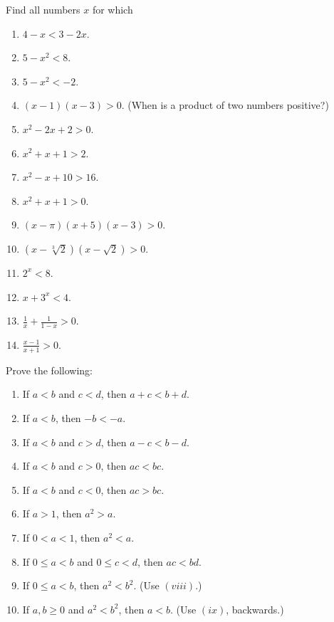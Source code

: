 \documentclass[12pt]{article}
\newenvironment{problem}[2][Problem]{\begin{trivlist}
\item[\hskip \labelsep {\bfseries #1}\hskip \labelsep {\bfseries #2.}]}{\end{trivlist}}
\begin{document}
\begin{problem}{1.4}
Find all numbers $x$ for which
\begin{enumerate}[label=(\roman*)]
	\item $4-x < 3-2x$.
	\item $5-x^2 < 8$.
	\item $5-x^2 < -2$.
	\item $\left(x-1\right)\left(x-3\right) > 0$. (When is a product of two numbers positive?)
	\item $x^2 - 2x+2 > 0$.
	\item $x^2+x+1>2$.
	\item $x^2 -x+10 > 16$.
	\item $x^2+x+1>0$.
	\item $\left(x-\pi\right)\left(x+5\right)\left(x-3\right) > 0$.
	\item $\left(x-\sqrt[3]{2}\right)\left(x-\sqrt{2}\right) > 0$.
	\item $2^x < 8$.
	\item $x+3^x < 4$.
	\item $\frac{1}{x} + \frac{1}{1-x} > 0$.
	\item $\frac{x-1}{x+1} > 0$.
\end{enumerate}
\end{problem}

\begin{problem}{1.5}
Prove the following:
\begin{enumerate}[label=(\roman*)]
	\item If $a<b$ and $c<d$, then $a+c < b+d$.
	\item If $a<b$, then $-b < -a$.
	\item If $a<b$ and $c>d$, then $a-c<b-d$.
	\item If $a<b$ and $c>0$, then $ac < bc$.
	\item If $a<b$ and $c<0$, then $ac >bc$.
	\item If $a>1$, then $a^2 > a$.
	\item If $0<a<1$, then $a^2<a$.
	\item If $0\leq a < b$ and $0\leq c < d$, then $ac<bd$.
	\item If $0\leq a < b$, then $a^2 < b^2$. (Use $\left(viii\right)$.)
	\item If $a,b\geq 0$ and $a^2 < b^2$, then $a<b$. (Use $\left(ix\right)$, backwards.)
\end{enumerate}
\end{problem}
\end{document}
